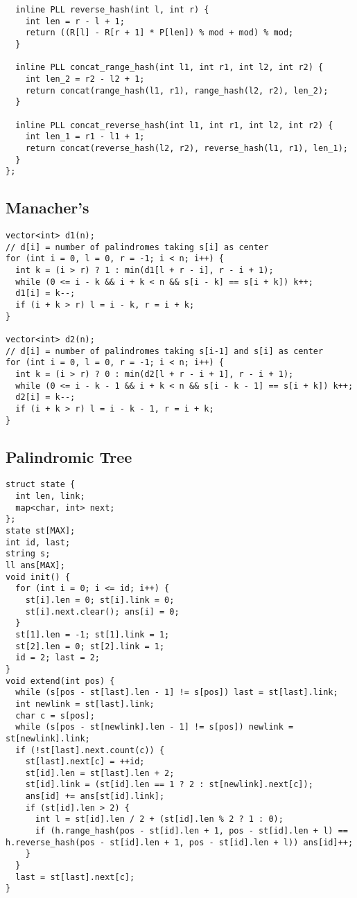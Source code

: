 \documentclass[FSZ,a4paper,onesided]{article}
\begin{document}
\begin{multicols*}{\COLS}
\begin{lstlisting}
  inline PLL reverse_hash(int l, int r) {
    int len = r - l + 1;
    return ((R[l] - R[r + 1] * P[len]) % mod + mod) % mod;
  }

  inline PLL concat_range_hash(int l1, int r1, int l2, int r2) {
    int len_2 = r2 - l2 + 1;
    return concat(range_hash(l1, r1), range_hash(l2, r2), len_2);
  }

  inline PLL concat_reverse_hash(int l1, int r1, int l2, int r2) {
    int len_1 = r1 - l1 + 1;
    return concat(reverse_hash(l2, r2), reverse_hash(l1, r1), len_1);
  }
};
\end{lstlisting}
\subsection{Manacher's}
\begin{lstlisting}
vector<int> d1(n);
// d[i] = number of palindromes taking s[i] as center
for (int i = 0, l = 0, r = -1; i < n; i++) {
  int k = (i > r) ? 1 : min(d1[l + r - i], r - i + 1);
  while (0 <= i - k && i + k < n && s[i - k] == s[i + k]) k++;
  d1[i] = k--;
  if (i + k > r) l = i - k, r = i + k;
}

vector<int> d2(n);
// d[i] = number of palindromes taking s[i-1] and s[i] as center
for (int i = 0, l = 0, r = -1; i < n; i++) {
  int k = (i > r) ? 0 : min(d2[l + r - i + 1], r - i + 1);
  while (0 <= i - k - 1 && i + k < n && s[i - k - 1] == s[i + k]) k++;
  d2[i] = k--;
  if (i + k > r) l = i - k - 1, r = i + k;
}
\end{lstlisting}
\subsection{Palindromic Tree}
\begin{lstlisting}
struct state {
  int len, link;
  map<char, int> next;
};
state st[MAX];
int id, last;
string s;
ll ans[MAX];
void init() {
  for (int i = 0; i <= id; i++) {
    st[i].len = 0; st[i].link = 0;
    st[i].next.clear(); ans[i] = 0;
  }
  st[1].len = -1; st[1].link = 1;
  st[2].len = 0; st[2].link = 1;
  id = 2; last = 2;
}
void extend(int pos) {
  while (s[pos - st[last].len - 1] != s[pos]) last = st[last].link;
  int newlink = st[last].link;
  char c = s[pos];
  while (s[pos - st[newlink].len - 1] != s[pos]) newlink = st[newlink].link;
  if (!st[last].next.count(c)) {
    st[last].next[c] = ++id;
    st[id].len = st[last].len + 2;
    st[id].link = (st[id].len == 1 ? 2 : st[newlink].next[c]);
    ans[id] += ans[st[id].link];
    if (st[id].len > 2) {
      int l = st[id].len / 2 + (st[id].len % 2 ? 1 : 0);
      if (h.range_hash(pos - st[id].len + 1, pos - st[id].len + l) == h.reverse_hash(pos - st[id].len + 1, pos - st[id].len + l)) ans[id]++;
    }
  }
  last = st[last].next[c];
}
\end{lstlisting}

\end{multicols*}
\end{document}
